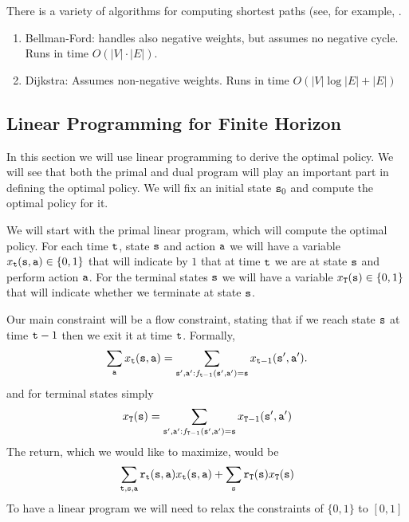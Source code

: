There is a variety of algorithms for computing shortest paths (see, for example, \cite{BookCormenLRS2009}.
\begin{enumerate}
\item
Bellman-Ford: handles also negative weights, but assumes no negative
cycle. Runs in time $O(|V|\cdot|E|)$.
\item
Dijkstra: Assumes non-negative weights. Runs in time $O(|V|\log |E|
+|E|)$
\end{enumerate}

\begin{leftbar}

\section{Linear Programming for Finite Horizon}
\label{sec:ddp-FH-LP}


In this section we will use linear programming to derive the optimal
policy. We will see that both the primal and dual program will play
an important part in defining the optimal policy. We will fix an
initial state ${\tt s}_0$ and compute the optimal policy for it.

We will start with the primal linear program, which will compute the
optimal policy. For each time ${\tt t}$, state ${\tt s}$ and action
${\tt a}$ we will have a variable $x_{{\tt t}}({\tt s},{\tt a})\in\{0,1\}$ that
will indicate by $1$ that at time ${\tt t}$ we are at state ${\tt s}$
and perform action ${\tt a}$. For the terminal states ${\tt s}$ we
will have a variable $x_{{\tt T}}({\tt s})\in\{0,1\}$ that will
indicate whether we terminate at state ${\tt s}$.

Our main constraint will be a flow constraint, stating that if we
reach state ${\tt s}$ at time ${\tt t}-1$ then we exit it at time
${\tt t}$. Formally,
\[
\sum_{{\tt a}}
x_{{\tt t}}({\tt s},{\tt a})=\sum_{{\tt s}',{\tt a}':f_{{\tt t}-1}({\tt s}',{\tt a}')={\tt s}}
x_{{\tt t}-1}({\tt s}',{\tt a}').
\]
and for terminal states simply
\[
x_{{\tt T}}({\tt s})=\sum_{{\tt s}',{\tt a}':f_{{\tt T}-1}({\tt s}',{\tt a}')={\tt s}}
x_{{\tt T}-1}({\tt s}',{\tt a}')
\]
The return, which we would like to maximize, would be
\[
\sum_{{\tt t},{\tt s},{\tt a}}
{\tt r}_{{\tt t}}({\tt s},{\tt a})x_{{\tt t}}({\tt s},{\tt a})+\sum_{{\tt s}}{\tt r}_{{\tt T}}({\tt s})x_{{\tt T}}({\tt s})
\]
To have a linear program we will need to relax the constraints of
$\{0,1\}$ to $[0,1]$


\end{leftbar}
